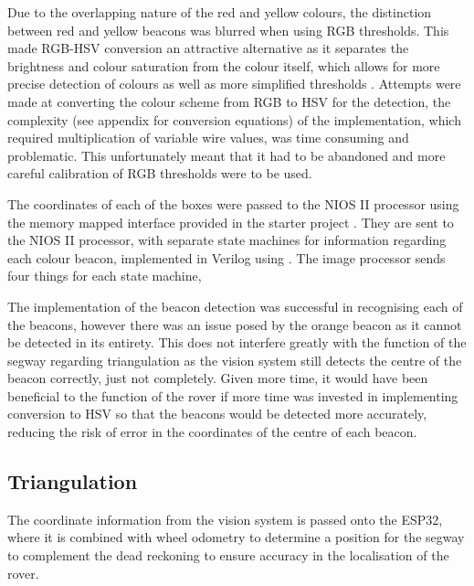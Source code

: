 Due to the overlapping nature of the red and yellow colours, the distinction between red and yellow beacons was blurred when using RGB thresholds. This made RGB-HSV conversion an attractive alternative as it separates the brightness and colour saturation from the colour itself, which allows for more precise detection of colours as well as more simplified thresholds \cite{ref:colorspace}. Attempts were made at converting the colour scheme from RGB to HSV for the detection, the complexity (see appendix for conversion equations) of the implementation, which required multiplication of variable wire values, was time consuming and problematic. This unfortunately meant that it had to be abandoned and more careful calibration of RGB thresholds were to be used.

The coordinates of each of the boxes were passed to the NIOS II processor using the memory mapped interface provided in the starter project \cite{ref:fpga_starter}. They are sent to the NIOS II processor, with separate state machines for information regarding each colour beacon, implemented in Verilog using . The image processor sends four things for each state machine, 

The implementation of the beacon detection was successful in recognising each of the beacons, however there was an issue posed by the orange beacon as it cannot be detected in its entirety. This does not interfere greatly with the function of the segway regarding triangulation as the vision system still detects the centre of the beacon correctly, just not completely. Given more time, it would have been beneficial to the function of the rover if more time was invested in implementing conversion to HSV so that the beacons would be detected more accurately, reducing the risk of error in the coordinates of the centre of each beacon.

\subsection{Triangulation}

The coordinate information from the vision system is passed onto the ESP32, where it is combined with wheel odometry to determine a position for the segway to complement the dead reckoning to ensure accuracy in the localisation of the rover.

